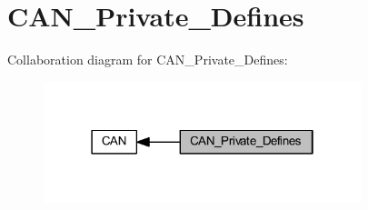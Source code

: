 \hypertarget{group___c_a_n___private___defines}{}\section{C\+A\+N\+\_\+\+Private\+\_\+\+Defines}
\label{group___c_a_n___private___defines}
Collaboration diagram for C\+A\+N\+\_\+\+Private\+\_\+\+Defines\+:
\nopagebreak
\begin{figure}[H]
\begin{center}
\leavevmode
\includegraphics[width=262pt]{group___c_a_n___private___defines}
\end{center}
\end{figure}
